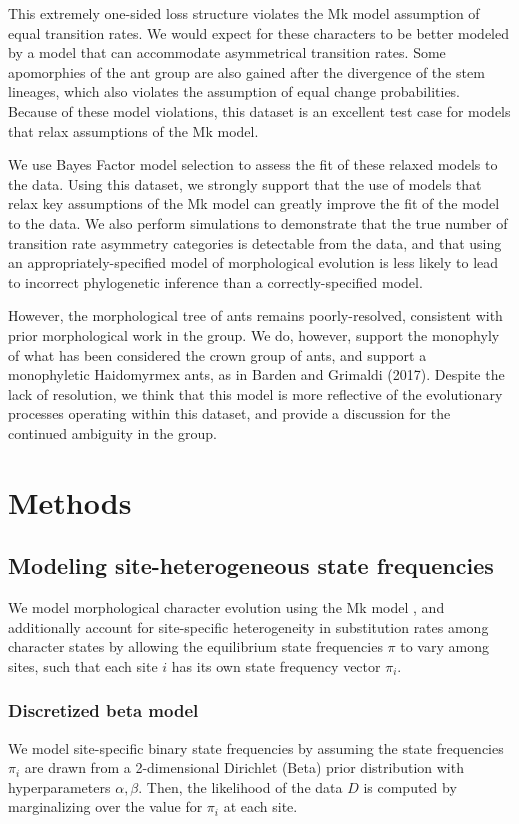 \documentclass[]{article}
\begin{document}
This extremely one-sided loss structure violates the Mk model assumption of equal transition rates. 
We would expect for these characters to be better modeled by a model that can accommodate asymmetrical transition rates.
Some apomorphies of the ant group are also gained after the divergence of the stem lineages, which also violates the assumption of equal change probabilities.
Because of these model violations, this dataset is an excellent test case for models that relax assumptions of the Mk model. \par
We use Bayes Factor model selection to assess the fit of these relaxed models to the data.
Using this dataset, we strongly support that the use of models that relax key assumptions of the Mk model can greatly improve the fit of the model to the data.
We also perform simulations to demonstrate that the true number of transition rate asymmetry categories is detectable from the data, and that using an appropriately-specified model of morphological evolution is less likely to lead to incorrect phylogenetic inference than a correctly-specified model.\par
However, the morphological tree of ants remains poorly-resolved, consistent with prior morphological work in the group.
We do, however, support the monophyly of what  has been considered the crown group of ants, and support a monophyletic Haidomyrmex ants, as in Barden and Grimaldi (2017). 
Despite the lack of resolution, we think that this model is more reflective of the evolutionary processes operating within this dataset, and provide a discussion for the continued ambiguity in the group. \par

\section{Methods}

\subsection{Modeling site-heterogeneous state frequencies}

We model morphological character evolution using the Mk model \citep{lewis2001likelihood}, and additionally account for site-specific heterogeneity in substitution rates among character states by allowing the equilibrium state frequencies $\pi$ to vary among sites, such that each site $i$ has its own state frequency vector $\pi_i$.

\subsubsection{Discretized beta model}
We model site-specific binary state frequencies by assuming the state frequencies $\pi_i$ are drawn from a 2-dimensional Dirichlet (Beta) prior distribution with hyperparameters $\alpha,\beta$.
Then, the likelihood of the data $D$ is computed by marginalizing over the value for $\pi_i$ at each site.
\end{document}
